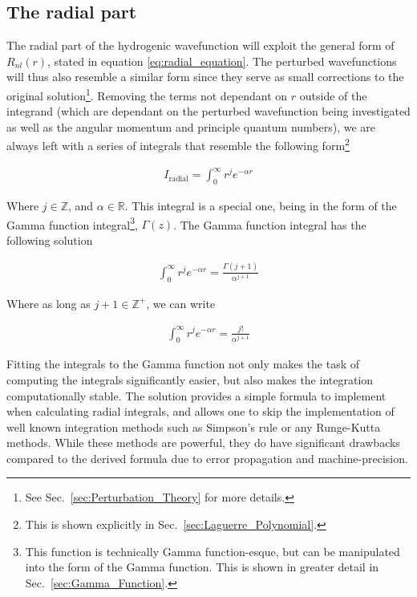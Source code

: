         \subsection{The radial part} \label{sec:The_Radial_Part}
            The radial part of the hydrogenic wavefunction will exploit the general form of $R_{nl}(r)$, stated in equation \ref{eq:radial_equation}. The perturbed wavefunctions will thus also resemble a similar form since they serve as small corrections to the original solution\footnote{See Sec.~\ref{sec:Perturbation_Theory} for more details.}. Removing the terms not dependant on $r$ outside of the integrand (which are dependant on the perturbed wavefunction being investigated as well as the angular momentum and principle quantum numbers), we are always left with a series of integrals that resemble the following form\footnote{This is shown explicitly in Sec.~\ref{sec:Laguerre_Polynomial}.}

            \begin{align}
                I_{\text{radial}} = \int_0^\infty r^j e^{-\alpha r}
            \end{align}

            Where $j \in \mathbb{Z}$, and $\alpha \in \mathbb{R}$. This integral is a special one, being in the form of the Gamma function integral\footnote{This function is technically Gamma function-esque, but can be manipulated into the form of the Gamma function. This is shown in greater detail in Sec.~\ref{sec:Gamma_Function}.}, $\Gamma(z)$. The Gamma function integral has the following solution 

            \begin{align}
                \int_0^\infty r^j e^{-\alpha r} = \frac{\Gamma(j + 1)}{\alpha^{j + 1}}
            \end{align}

            Where as long as $j + 1 \in \mathbb{Z}^+$, we can write

            \begin{align}
                \int_0^\infty r^j e^{-\alpha r} = \frac{j!}{\alpha^{j + 1}}
            \end{align}

            Fitting the integrals to the Gamma function not only makes the task of computing the integrals significantly easier, but also makes the integration computationally stable. The solution provides a simple formula to implement when calculating radial integrals, and allows one to skip the implementation of well known integration methods such as Simpson's rule or any Runge-Kutta methods. While these methods are powerful, they do have significant drawbacks compared to the derived formula due to error propagation and machine-precision.
            
